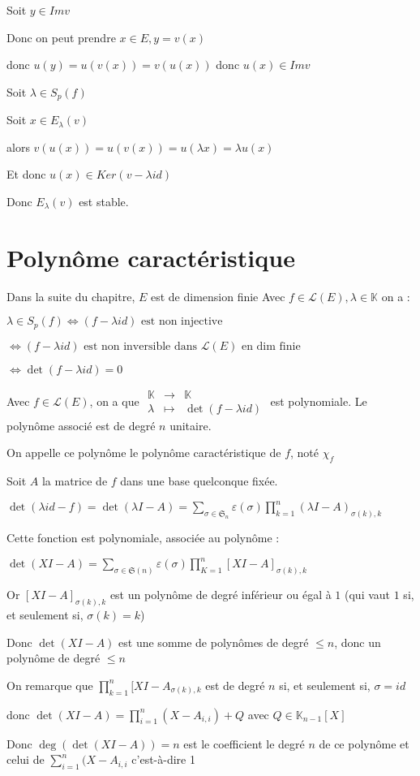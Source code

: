 \documentclass[a4paper,12pt]{book}
\newcommand{\Prop}[2]{\begin{tcolorbox}[sharp corners, colback=white,colframe=red!90!black!75, title=Proposition : #1]#2\end{tcolorbox}}
\newcommand{\Pre}[1]{\begin{tcolorbox}[sharp corners, colback=white,colframe=green!60!green!30!black!75, title=Preuve]#1\end{tcolorbox}}
\def\K{\mathbb{K}}
\begin{document}
\Pre{Soit $y\in Im v$ \par Donc on peut prendre $x\in E, y=v(x)$
\par donc $u(y)=u(v(x))=v(u(x))$ donc $u(x)\in Im v$ \par Soit $\lambda \in S_p(f)$ \par Soit $x\in E_\lambda(v)$ \par alors $v(u(x))=u(v(x))=u(\lambda x)=\lambda u(x)$ \par Et donc $u(x)\in Ker(v-\lambda id)$ \par Donc $E_\lambda(v)$ est stable.}

\section{Polynôme caractéristique}
Dans la suite du chapitre, $E$ est de dimension finie
Avec $f\in\mathcal{L}(E), \lambda\in\K$ on a :\par $\lambda\in S_p(f)\Leftrightarrow (f-\lambda id)\text{ est non injective}$ \par $\Leftrightarrow (f-\lambda id)\text{ est non inversible dans $\mathcal{L}(E)$ en dim finie}$\par $\Leftrightarrow \det (f-\lambda id)=0$
\Prop{Polynôme caractéristique}{Avec $f\in\mathcal{L}(E)$, on a que $\begin{array}{rcl} \K & \to & \K \\ \lambda & \mapsto & \det (f-\lambda id)\end{array}$ est polynomiale. Le polynôme associé est de degré $n$ unitaire.
\par On appelle ce polynôme le polynôme caractéristique de $f$, noté $\chi_f$}
\Pre{Soit $A$ la matrice de $f$ dans une base quelconque fixée. \par $\det (\lambda id-f)=\det (\lambda I - A)=\sum\limits_{\sigma\in\mathfrak{S}_n}\varepsilon(\sigma)\prod\limits_{k=1}^n(\lambda I-A)_{\sigma(k),k}$\par Cette fonction est polynomiale, associée au polynôme : \par $\det(XI-A)=\sum\limits_{\sigma\in\mathfrak{S}(n)}\varepsilon(\sigma)\prod\limits_{K=1}^n[XI-A]_{\sigma(k),k}$ \par Or $[XI-A]_{\sigma(k),k}$ est un polynôme de degré inférieur ou égal à $1$ (qui vaut $1$ si, et seulement si, $\sigma(k)=k$)
\par Donc $\det(XI-A)$ est une somme de polynômes de degré $\leq n$, donc un polynôme de degré $\leq n$ \par On remarque que $\prod\limits_{k=1}^n[XI-A_{\sigma(k),k}$ est de degré $n$ si, et seulement si, $\sigma =id$ \par donc $\det(XI-A)=\prod\limits_{i=1}^n(X-A_{i,i})+Q$ avec $Q\in\K_{n-1}[X]$ \par Donc $\deg(\det(XI-A))=n$ est le coefficient le degré $n$ de ce polynôme et celui de $\sum\limits_{i=1}^n(X-A_{i,i}$ c'est-à-dire 1}
\end{document}
